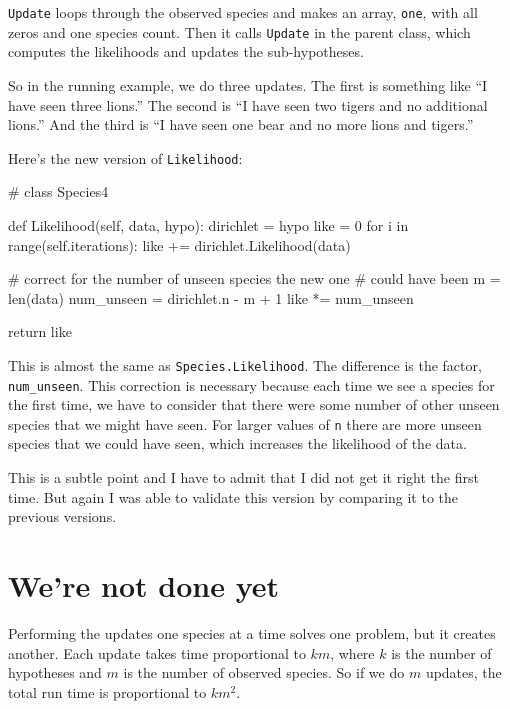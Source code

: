\documentclass[12pt]{book}
\theoremstyle{exercise}
\newcommand{\py}[1]{{\tt #1}}%
\begin{document}
\py{Update} loops through the observed species and makes an
array, \py{one}, with all zeros and one species count.  Then
it calls \py{Update} in the parent class, which computes
the likelihoods and updates the sub-hypotheses.

So in the running example, we do three updates.  The first
is something like ``I have seen three lions.''  The second is
``I have seen two tigers and no additional lions.''  And the third
is ``I have seen one bear and no more lions and tigers.''

Here's the new version of \py{Likelihood}:

\begin{code}
# class Species4

    def Likelihood(self, data, hypo):
        dirichlet = hypo
        like = 0
        for i in range(self.iterations):
            like += dirichlet.Likelihood(data)

        # correct for the number of unseen species the new one
        # could have been
        m = len(data)
        num_unseen = dirichlet.n - m + 1
        like *= num_unseen

        return like
\end{code}

This is almost the same as \py{Species.Likelihood}.  The difference
is the factor, \verb"num_unseen".  This correction is necessary
because each time we see a species for the first time, we have to
consider that there were some number of other unseen species that
we might have seen.  For larger values of \py{n} there are more
unseen species that we could have seen, which increases the likelihood
of the data.

This is a subtle point and I have to admit that I did not get it right
the first time.  But again I was able to validate this version
by comparing it to the previous versions.


\section{We're not done yet}

\newcommand{\BigO}[1]{\mathcal{O}(#1)}

Performing the updates one species at a time solves one problem, but
it creates another.  Each update takes time proportional to $k m$,
where $k$ is the number of hypotheses and $m$ is the number of observed
species.  So if we do $m$ updates, the total run time is
proportional to $k m^2$.
\end{document}
